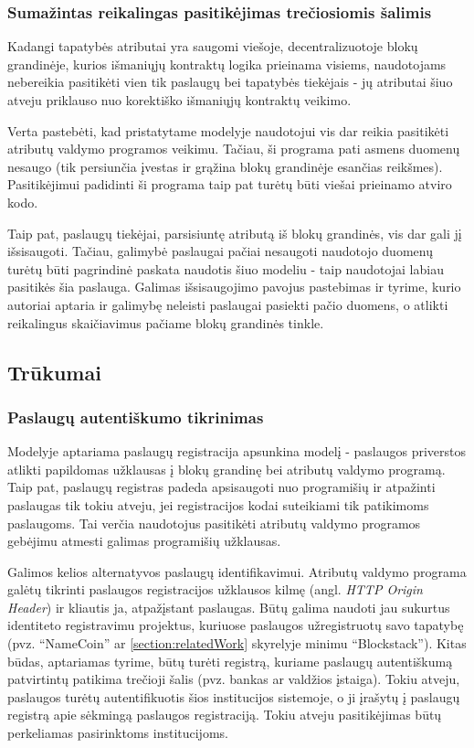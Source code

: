 \subsubsection{Sumažintas reikalingas pasitikėjimas trečiosiomis šalimis}

Kadangi tapatybės atributai yra saugomi viešoje, decentralizuotoje blokų grandinėje, kurios išmaniųjų kontraktų
logika prieinama visiems, naudotojams nebereikia pasitikėti vien tik paslaugų bei tapatybės tiekėjais - jų
atributai šiuo atveju priklauso nuo korektiško išmaniųjų kontraktų veikimo.

Verta pastebėti, kad
pristatytame modelyje naudotojui vis dar reikia pasitikėti atributų valdymo programos veikimu. Tačiau, ši programa pati
asmens duomenų nesaugo (tik persiunčia įvestas ir grąžina blokų grandinėje esančias reikšmes). Pasitikėjimui
padidinti ši programa taip pat turėtų būti viešai prieinamo atviro kodo.

Taip pat, paslaugų tiekėjai, parsisiuntę atributą
iš blokų grandinės, vis dar gali jį išsisaugoti. Tačiau, galimybė paslaugai pačiai nesaugoti naudotojo duomenų turėtų būti pagrindinė paskata
naudotis šiuo modeliu - taip naudotojai labiau pasitikės šia paslauga. Galimas išsisaugojimo pavojus pastebimas ir
\cite{MITPaper} tyrime, kurio autoriai aptaria ir galimybę neleisti paslaugai pasiekti pačio duomens, o atlikti
reikalingus skaičiavimus pačiame blokų grandinės tinkle.

\subsection{Trūkumai}

\subsubsection{Paslaugų autentiškumo tikrinimas}

Modelyje aptariama paslaugų registracija apsunkina modelį - paslaugos priverstos
atlikti papildomas užklausas į blokų grandinę bei atributų valdymo programą. Taip pat, paslaugų registras padeda apsisaugoti nuo programišių
ir atpažinti paslaugas tik tokiu atveju,
jei registracijos kodai suteikiami tik patikimoms paslaugoms. Tai verčia naudotojus pasitikėti atributų valdymo programos gebėjimu
atmesti galimas programišių užklausas. 

Galimos kelios alternatyvos paslaugų identifikavimui. Atributų valdymo programa galėtų tikrinti paslaugos registracijos užklausos
kilmę (angl. \textit{HTTP Origin Header}) ir kliautis ja, atpažįstant paslaugas. Būtų galima naudoti jau sukurtus identiteto
registravimu projektus, kuriuose paslaugos užregistruotų savo tapatybę (pvz. \enquote{NameCoin} ar \hypertarget{section:relatedWork}{\ref{section:relatedWork}}
skyrelyje minimu \enquote{Blockstack}). Kitas būdas, aptariamas \cite{Baars2016} tyrime, būtų turėti registrą, kuriame paslaugų autentiškumą
patvirtintų patikima trečioji šalis (pvz. bankas ar valdžios įstaiga). Tokiu atveju, paslaugos turėtų autentifikuotis šios institucijos
sistemoje, o ji įrašytų į paslaugų registrą apie sėkmingą paslaugos registraciją. Tokiu atveju pasitikėjimas būtų perkeliamas
pasirinktoms institucijoms.

